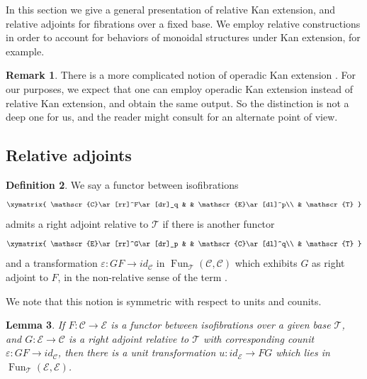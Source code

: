 \documentclass[reqno]{amsart}
\newtheorem{lemma}{Lemma}[section]
\theoremstyle{definition}
\newtheorem{definition}[lemma]{Definition}
\newtheorem{remark}[lemma]{Remark}
\newcommand{\msc}[1]{\mathscr{#1}}
\DeclareMathOperator{\Fun}{Fun}
\renewcommand{\1}{\mathbf{1}}
\begin{document}
In this section we give a general presentation of relative Kan extension, and relative adjoints for fibrations over a fixed base.  We employ relative constructions in order to account for behaviors of monoidal structures under Kan extension, for example.

\begin{remark}
There is a more complicated notion of operadic Kan extension \cite[Definition 3.1.2.2]{ha}. For our purposes, we expect that one can employ operadic Kan extension instead of relative Kan extension, and obtain the same output. So the distinction is not a deep one for us, and the reader might consult \cite[Section 3.1.2]{ha} for an alternate point of view.
\end{remark}

\subsection{Relative adjoints}

\begin{definition}
We say a functor between isofibrations
\[
\xymatrix{
\msc{C}\ar[rr]^F\ar[dr]_q & & \msc{E}\ar[dl]^p\\
	& \msc{T}
}
\]
admits a right adjoint relative to $\msc{T}$ if there is another functor
\[
\xymatrix{
\msc{E}\ar[rr]^G\ar[dr]_p & & \msc{C}\ar[dl]^q\\
	& \msc{T}
}
\]
and a transformation $\varepsilon:GF\to id_{\msc{C}}$ in $\Fun_{\msc{T}}(\msc{C},\msc{C})$ which exhibits $G$ as right adjoint to $F$, in the non-relative sense of the term \cite[\href{https://kerodon.net/tag/02EJ}{02EJ}]{kerodon}.
\end{definition}

We note that this notion is symmetric with respect to units and counits.

\begin{lemma}
If $F:\msc{C}\to \msc{E}$ is a functor between isofibrations over a given base $\msc{T}$, and $G:\msc{E}\to \msc{C}$ is a right adjoint relative to $\msc{T}$ with corresponding counit $\varepsilon:GF\to id_{\msc{C}}$, then there is a unit transformation $u:id_{\msc{E}}\to FG$ which lies in $\Fun_{\msc{T}}(\msc{E},\msc{E})$.
\end{lemma}
\end{document}
